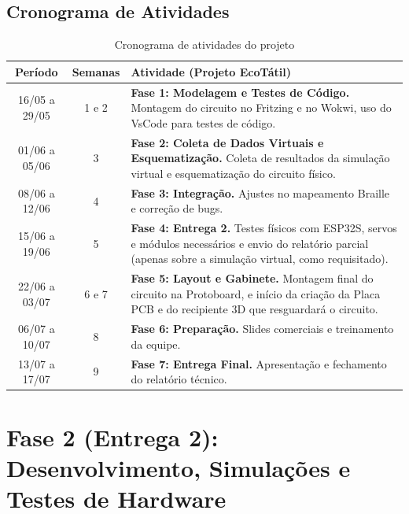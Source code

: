 \documentclass[12pt, a4paper]{article}
\begin{document}
\subsection{Cronograma de Atividades}
\vspace{0.5cm}
\begin{table}[h]
\centering
\renewcommand{\arraystretch}{1.3}
\begin{tabularx}{\textwidth}{|c|c|>{\raggedright\arraybackslash}X|}
\hline
\textbf{Período} & \textbf{Semanas} & \textbf{Atividade (Projeto EcoTátil)} \\ \hline
16/05 a 29/05 & 1 e 2 & \textbf{Fase 1: Modelagem e Testes de Código.} Montagem do circuito no Fritzing e no Wokwi, uso do VsCode para testes de código. \\ \hline
01/06 a 05/06 & 3 & \textbf{Fase 2: Coleta de Dados Virtuais e Esquematização.} Coleta de resultados da simulação virtual e esquematização do circuito físico. \\ \hline
08/06 a 12/06 & 4 & \textbf{Fase 3: Integração.} Ajustes no mapeamento Braille e correção de bugs. \\ \hline
15/06 a 19/06 & 5 & \textbf{Fase 4: Entrega 2.} Testes físicos com ESP32S, servos e módulos necessários e envio do relatório parcial (apenas sobre a simulação virtual, como requisitado). \\ \hline
22/06 a 03/07 & 6 e 7 & \textbf{Fase 5: Layout e Gabinete.} Montagem final do circuito na Protoboard, e início da criação da Placa PCB e do recipiente 3D que resguardará o circuito. \\ \hline
06/07 a 10/07 & 8 & \textbf{Fase 6: Preparação.} Slides comerciais e treinamento da equipe. \\ \hline
13/07 a 17/07 & 9 & \textbf{Fase 7: Entrega Final.} Apresentação e fechamento do relatório técnico. \\ \hline
\end{tabularx}
\caption{Cronograma de atividades do projeto}
\label{tab:cronograma}
\end{table}

\newpage
\section{Fase 2 (Entrega 2): Desenvolvimento, Simulações e Testes de Hardware}
\end{document}
